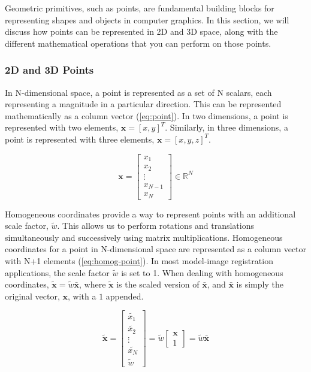 Geometric primitives, such as points, are fundamental building blocks for representing shapes and objects in computer graphics. In this section, we will discuss how points can be represented in 2D and 3D space, along with the different mathematical operations that you can perform on those points.

\subsubsection{2D and 3D Points}
\label{sec:geometric-points}
In N-dimensional space, a point is represented as a set of N scalars, each representing a magnitude in a particular direction. This can be represented mathematically as a column vector (\cref{eq:point}). In two dimensions, a point is represented with two elements, $\mathbf{x} = [x , y]^{T}$. Similarly, in three dimensions, a point is represented with three elements, $\mathbf{x} = [x , y , z]^{T}$.

\begin{equation}
    \mathbf{x} = \begin{bmatrix}
        x_1 \\ x_2 \\ \vdots \\ x_{N-1} \\ x_N
    \end{bmatrix} \in \mathbb{R}^N
    \label{eq:point}
\end{equation}

Homogeneous coordinates provide a way to represent points with an additional scale factor, $\tilde{w}$. This allows us to perform rotations and translations simultaneously and successively using matrix multiplications. Homogeneous coordinates for a point in N-dimensional space are represented as a column vector with N+1 elements (\cref{eq:homog-point}). In most model-image registration applications, the scale factor $\tilde{w}$ is set to 1. When dealing with homogeneous coordinates, $\mathbf{\tilde{x}} = \tilde{w}\mathbf{\bar{x}}$, where $\mathbf{\tilde{x}}$ is the scaled version of $\bar{\mathbf{x}}$, and $\bar{\mathbf{x}}$ is simply the original vector, $\mathbf{x}$, with a $1$ appended.

\begin{equation}
    \tilde{\mathbf{x}} = \begin{bmatrix}
        \tilde{x_1} \\ \tilde{x_2} \\ \vdots \\ \tilde{x_N} \\ \tilde{w}
    \end{bmatrix} = \tilde{w}\begin{bmatrix}
        \mathbf{x}\\ 1
    \end{bmatrix} = \tilde{w}\bar{\mathbf{x}}
    \label{eq:homog-point}
\end{equation}

